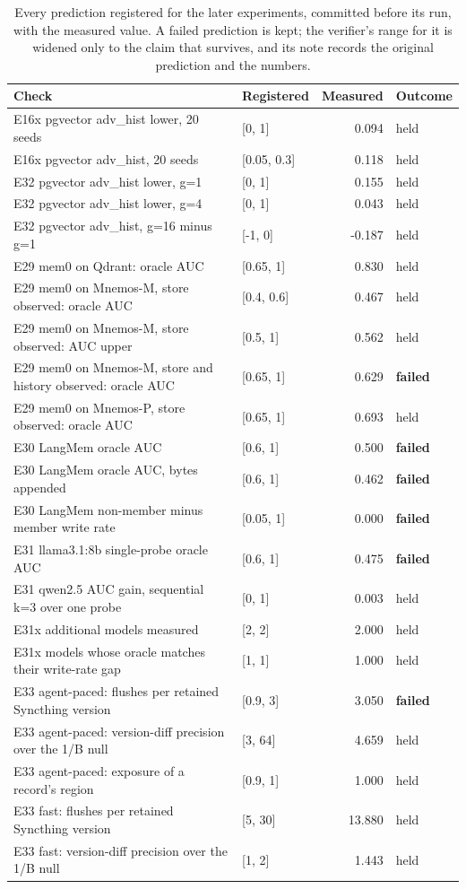 \begin{table}[t]
\centering
\caption{Every prediction registered for the later experiments, committed before its run,
with the measured value. A failed prediction is kept; the verifier's range for it is widened only
to the claim that survives, and its note records the original prediction and the numbers.}
\label{tab:supp-registered}
\scriptsize
\setlength{\tabcolsep}{4pt}
\begin{tabular}{p{}p{}rl}
\toprule
Check & Registered & Measured & Outcome \\
\midrule
E16x pgvector adv\_hist lower, 20 seeds & [0, 1] & 0.094 & held \\
E16x pgvector adv\_hist, 20 seeds & [0.05, 0.3] & 0.118 & held \\
E32 pgvector adv\_hist lower, g=1 & [0, 1] & 0.155 & held \\
E32 pgvector adv\_hist lower, g=4 & [0, 1] & 0.043 & held \\
E32 pgvector adv\_hist, g=16 minus g=1 & [-1, 0] & -0.187 & held \\
E29 mem0 on Qdrant: oracle AUC & [0.65, 1] & 0.830 & held \\
E29 mem0 on Mnemos-M, store observed: oracle AUC & [0.4, 0.6] & 0.467 & held \\
E29 mem0 on Mnemos-M, store observed: AUC upper & [0.5, 1] & 0.562 & held \\
E29 mem0 on Mnemos-M, store and history observed: oracle AUC & [0.65, 1] & 0.629 & \textbf{failed} \\
E29 mem0 on Mnemos-P, store observed: oracle AUC & [0.65, 1] & 0.693 & held \\
E30 LangMem oracle AUC & [0.6, 1] & 0.500 & \textbf{failed} \\
E30 LangMem oracle AUC, bytes appended & [0.6, 1] & 0.462 & \textbf{failed} \\
E30 LangMem non-member minus member write rate & [0.05, 1] & 0.000 & \textbf{failed} \\
E31 llama3.1:8b single-probe oracle AUC & [0.6, 1] & 0.475 & \textbf{failed} \\
E31 qwen2.5 AUC gain, sequential k=3 over one probe & [0, 1] & 0.003 & held \\
E31x additional models measured & [2, 2] & 2.000 & held \\
E31x models whose oracle matches their write-rate gap & [1, 1] & 1.000 & held \\
E33 agent-paced: flushes per retained Syncthing version & [0.9, 3] & 3.050 & \textbf{failed} \\
E33 agent-paced: version-diff precision over the 1/B null & [3, 64] & 4.659 & held \\
E33 agent-paced: exposure of a record's region & [0.9, 1] & 1.000 & held \\
E33 fast: flushes per retained Syncthing version & [5, 30] & 13.880 & held \\
E33 fast: version-diff precision over the 1/B null & [1, 2] & 1.443 & held \\
\bottomrule
\end{tabular}
\end{table}
